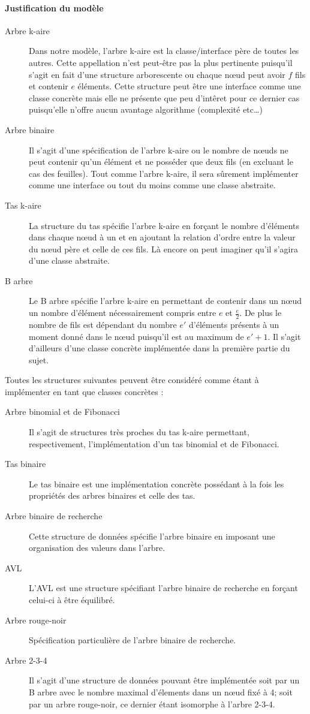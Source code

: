 \paragraph{Justification du modèle} 
\begin{description} 
\item[Arbre k-aire]Dans notre modèle, l'arbre k-aire est la classe/interface père de toutes les autres. Cette appellation n'est peut-être pas la plus pertinente puisqu'il s'agit en fait d'une structure arborescente ou chaque n\oe ud peut avoir $f$ fils et contenir $e$ éléments. Cette structure peut être une interface comme une classe concrète mais elle ne présente que peu d'intêret pour ce dernier cas puisqu'elle n'offre aucun avantage algorithme (complexité etc\dots )
\item[Arbre binaire] Il s'agit d'une spécification de l'arbre k-aire ou le nombre de n\oe uds ne peut contenir qu'un élément et ne posséder que deux fils (en excluant le cas des feuilles). Tout comme l'arbre k-aire, il sera sûrement implémenter comme une interface ou tout du moins comme une classe abstraite.
\item[Tas k-aire] La structure du tas spécifie l'arbre k-aire en forçant le nombre d'éléments dans chaque n\oe ud à un et en ajoutant la relation d'ordre entre la valeur du n\oe ud père et celle de ces fils. Là encore on peut imaginer qu'il s'agira d'une classe abstraite.
\item[B arbre] Le B arbre spécifie l'arbre k-aire en permettant de contenir dans un n\oe ud un nombre d'élément nécessairement compris entre $e$ et $\frac{e}{2}$. De plus le nombre de fils est dépendant du nombre $e'$ d'éléments présents à un moment donné dans le n\oe ud puisqu'il est au maximum de $e'+1$. Il s'agit d'ailleurs d'une classe concrète implémentée dans la première partie du sujet.
\end{description}

Toutes les structures suivantes peuvent être considéré comme étant à implémenter en tant que classes concrètes :
\begin{description} 
\item[Arbre binomial et de Fibonacci] Il s'agit de structures très proches du tas k-aire permettant, respectivement, l'implémentation d'un tas binomial et de Fibonacci.
\item[Tas binaire] Le tas binaire est une implémentation concrète possédant à la fois les propriétés des arbres binaires et celle des tas.
\item[Arbre binaire de recherche] Cette structure de données spécifie l'arbre binaire en imposant une organisation des valeurs dans l'arbre.
\item[AVL] L'AVL est une structure spécifiant l'arbre binaire de recherche en forçant celui-ci à être équilibré.
\item[Arbre rouge-noir] Spécification particulière de l'arbre binaire de recherche.
\item[Arbre 2-3-4] Il s'agit d'une structure de données pouvant être implémentée soit par un B arbre avec le nombre maximal d'élements dans un n\oe ud fixé à 4; soit par un arbre rouge-noir, ce dernier étant isomorphe à l'arbre 2-3-4.
\end{description}
